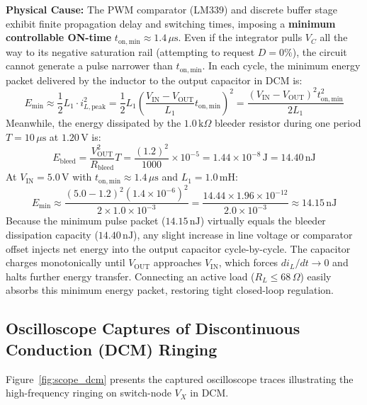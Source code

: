 \documentclass[12pt,a4paper]{article}
\newcommand{\Vout}{V_{\mathrm{OUT}}}
\newcommand{\Vin}{V_{\mathrm{IN}}}
\newcommand{\Vc}{V_C}
\newcommand{\Vx}{V_X}
\begin{document}
\textbf{Physical Cause:} The PWM comparator (LM339) and discrete buffer stage exhibit finite propagation delay and switching times, imposing a \textbf{minimum controllable ON-time} $t_{\mathrm{on,min}} \approx 1.4\,\mu\mathrm{s}$. Even if the integrator pulls $\Vc$ all the way to its negative saturation rail (attempting to request $D = 0\%$), the circuit cannot generate a pulse narrower than $t_{\mathrm{on,min}}$. In each cycle, the minimum energy packet delivered by the inductor to the output capacitor in DCM is:
\begin{equation}
    E_{\mathrm{min}} \approx \frac{1}{2} L_1 \cdot i_{L,\mathrm{peak}}^2 = \frac{1}{2} L_1 \left( \frac{\Vin - \Vout}{L_1} t_{\mathrm{on,min}} \right)^2 = \frac{(\Vin - \Vout)^2 t_{\mathrm{on,min}}^2}{2 L_1}
\end{equation}
Meanwhile, the energy dissipated by the $1.0\,\mathrm{k}\Omega$ bleeder resistor during one period $T = 10\,\mu\mathrm{s}$ at $1.20\,\mathrm{V}$ is:
\begin{equation}
    E_{\mathrm{bleed}} = \frac{\Vout^2}{R_{\mathrm{bleed}}} T = \frac{(1.2)^2}{1000} \times 10^{-5} = 1.44\times 10^{-8}\,\mathrm{J} = \mathbf{14.40\,\mathrm{nJ}}
\end{equation}
At $\Vin = 5.0\,\mathrm{V}$ with $t_{\mathrm{on,min}} \approx 1.4\,\mu\mathrm{s}$ and $L_1 = 1.0\,\mathrm{mH}$:
\begin{equation}
    E_{\mathrm{min}} \approx \frac{(5.0 - 1.2)^2 (1.4\times 10^{-6})^2}{2 \times 1.0\times 10^{-3}} = \frac{14.44 \times 1.96\times 10^{-12}}{2.0\times 10^{-3}} \approx \mathbf{14.15\,\mathrm{nJ}}
\end{equation}
Because the minimum pulse packet ($14.15\,\mathrm{nJ}$) virtually equals the bleeder dissipation capacity ($14.40\,\mathrm{nJ}$), any slight increase in line voltage or comparator offset injects net energy into the output capacitor cycle-by-cycle. The capacitor charges monotonically until $\Vout$ approaches $\Vin$, which forces $di_L/dt \to 0$ and halts further energy transfer. Connecting an active load ($R_L \le 68\,\Omega$) easily absorbs this minimum energy packet, restoring tight closed-loop regulation.

\subsection{Oscilloscope Captures of Discontinuous Conduction (DCM) Ringing}
Figure~\ref{fig:scope_dcm} presents the captured oscilloscope traces illustrating the high-frequency ringing on switch-node $\Vx$ in DCM.
\end{document}
